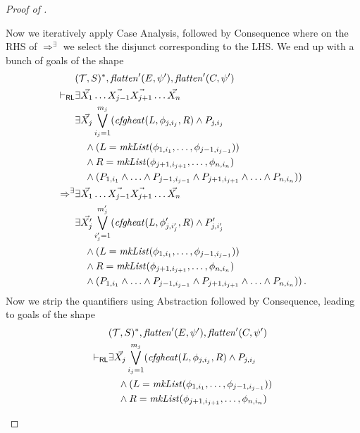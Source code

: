 \begin{proof}[Proof of ]
\begin{enumerate}
    Now we iteratively apply Case Analysis, followed by Consequence where on the RHS of $\Rightarrow^\exists$ we select the disjunct corresponding to the LHS.
    We end up with a bunch of goals of the shape
    \begin{align*}
        & (\mathcal{T}, S)^*, \mathit{flatten}^\prime(E, \psi^\prime), \mathit{flatten}^\prime(C, \psi^\prime)
        \\ \vdash_{\mathsf{RL}} &
        \exists \vec{X_1} \ldots \vec{X_{j-1}} \vec{X_{j+1}} \ldots \vec{X_n}
        \\& \exists \vec{X_j} \bigvee_{i_j=1}^{m_j} (\mathit{cfgheat}(L, \phi_{j, i_j}, R) \land P_{j, i_j}
        \\&\quad \land (L = \mathit{mkList}(\phi_{1, i_1}, \ldots, \phi_{j-1, i_{j-1}}))
        \\&\quad \land R = \mathit{mkList}(\phi_{j+1, i_{j+1}}, \ldots, \phi_{n, i_{n}})
        \\&\quad \land (P_{1, i_1} \land \ldots \land P_{j-1, i_{j-1}} \land P_{j+1, i_{j+1}} \land \ldots \land P_{n, i_n}))
        \\ \Rightarrow^\exists &
        \exists \vec{X_1} \ldots \vec{X_{j-1}} \vec{X_{j+1}} \ldots \vec{X_n}
        \\& \exists \vec{X^\prime_j} \bigvee_{i^\prime_j=1}^{m^\prime_j} (\mathit{cfgheat}(L, \phi^\prime_{j, i^\prime_j}, R) \land P^\prime_{j, i^\prime_j}
        \\&\quad \land (L = \mathit{mkList}(\phi_{1, i_1}, \ldots, \phi_{j-1, i_{j-1}}))
        \\&\quad \land R = \mathit{mkList}(\phi_{j+1, i_{j+1}}, \ldots, \phi_{n, i_{n}})
        \\&\quad \land (P_{1, i_1} \land \ldots \land P_{j-1, i_{j-1}} \land P_{j+1, i_{j+1}} \land \ldots \land P_{n, i_n})) \, .
    \end{align*}
    Now we strip the quantifiers using Abstraction followed by Consequence,
    leading to goals of the shape
    \begin{align*}
        & (\mathcal{T}, S)^*, \mathit{flatten}^\prime(E, \psi^\prime), \mathit{flatten}^\prime(C, \psi^\prime)
        \\ \vdash_\RL &
        \exists \vec{X_j} \bigvee_{i_j=1}^{m_j} (\mathit{cfgheat}(L, \phi_{j, i_j}, R) \land P_{j, i_j}
        \\&\quad \land (L = \mathit{mkList}(\phi_{1, i_1}, \ldots, \phi_{j-1, i_{j-1}}))
        \\&\quad \land R = \mathit{mkList}(\phi_{j+1, i_{j+1}}, \ldots, \phi_{n, i_{n}})

\end{align*}
\end{enumerate}
\end{proof}
